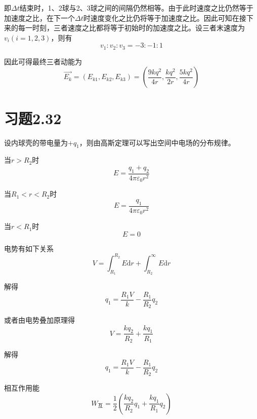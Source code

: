 \documentclass{SCIS2020cn}
\begin{document}
即$\Delta{t}$结束时，1、2球与2、3球之间的间隔仍然相等。由于此时速度之比仍然等于加速度之比，在下一个$\Delta{t}$时速度变化之比仍将等于加速度之比。因此可知在接下来的每一时刻，三者速度之比都将等于初始时的加速度之比。设三者末速度为$v_i(i=1,2,3)$，则有
\begin{equation}
    v_1:v_2:v_3=-3:-1:1
\end{equation}

因此可得最终三者动能为
\begin{equation}
    \overrightarrow{E_{k}}=(E_{k1},E_{k2},E_{k3})=\left(\frac{9kq^2}{4r},\frac{kq^2}{2r},\frac{5kq^2}{4r}\right)
\end{equation}

\section{习题2.32}
设内球壳的带电量为$+q_1$，则由高斯定理可以写出空间中电场的分布规律。

当$r>R_2$时
\begin{equation}
    E=\frac{q_1+q_2}{4\pi{}\varepsilon_0r^2}
\end{equation}

当$R_1<r<R_2$时
\begin{equation}
    E=\frac{q_1}{4\pi{}\varepsilon_0r^2}
\end{equation}

当$r<R_1$时
\begin{equation}
    E=0
\end{equation}

电势有如下关系
\begin{equation}
    V=\int_{R_1}^{R_2}E\text{d}r+\int_{R_2}^{\infty}E\text{d}r
\end{equation}

解得
\begin{equation}
    q_1=\frac{R_1V}{k}-\frac{R_1}{R_2}q_2
\end{equation}

或者由电势叠加原理得
\begin{equation}
    V=\frac{kq_2}{R_2}+\frac{kq_1}{R_1}
\end{equation}

解得
\begin{equation}
    q_1=\frac{R_1V}{k}-\frac{R_1}{R_2}q_2
\end{equation}

相互作用能
\begin{equation}
    W_{\text{互}}=\frac{1}{2}\left(\frac{kq_2}{R_2}q_1+\frac{kq_1}{R_1}q_2\right)
\end{equation}
\end{document}
